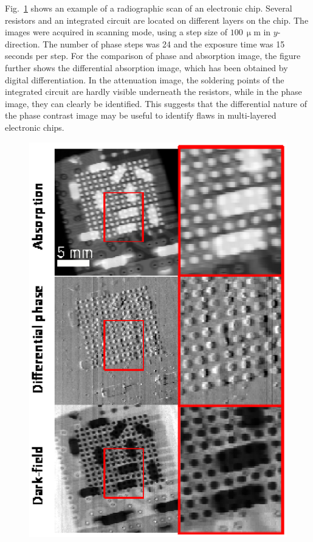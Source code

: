 \documentclass[aip,apl,amsmath,amssymb,floatfix,reprint,a4paper]{revtex4-1}
\newcommand{\unit}[1]{\ensuremath{\, \mathrm{#1}}}
\begin{document}
Fig.~\ref{Fig:img_chip} shows an example of a radiographic scan of an electronic chip. Several resistors and an integrated circuit are located on different layers on the chip. The images were acquired in scanning mode, using a step size of $100 \unit{\upmu m}$ in $y$-direction. The number of phase steps \cite{Weitkamp2005} was 24 and the exposure time was 15 seconds per step. For the comparison of phase and absorption image, the figure further shows the differential absorption image, which has been obtained by digital differentiation. In the attenuation image, the soldering points of the integrated circuit are hardly visible underneath the resistors, while in the phase image, they can clearly be identified. This suggests that the differential nature of the phase contrast image may be useful to identify flaws in multi-layered electronic chips.
\begin{figure} [ht]
  \includegraphics[width = \linewidth]{figures/img_chip.eps}
  \caption{}
  \label{Fig:img_chip}
\end{figure}
\end{document}
